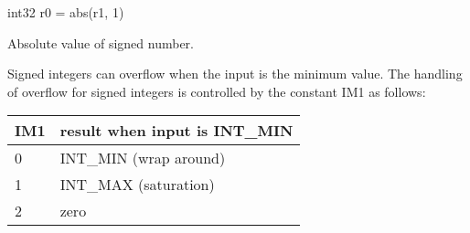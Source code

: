 \documentclass[forwardcom.tex]{subfiles}
\begin{document}
int32 r0 = abs(r1, 1)
\vspace{2mm}


Absolute value of signed number.
\vspace{2mm}

Signed integers can overflow when the input is the minimum value.
The handling of overflow for signed integers is controlled by the constant IM1 as follows:

\begin{longtable}{|p{12mm}|p{80mm}|}
\endfirsthead
\endhead
\hline
\bfseries IM1 & \bfseries result when input is INT\_MIN \\ \hline
0  & INT\_MIN (wrap around) \\ \hline
1  & INT\_MAX (saturation)  \\ \hline
2  & zero                   \\ \hline
\end{longtable}
\vspace{2mm}
\end{document}

